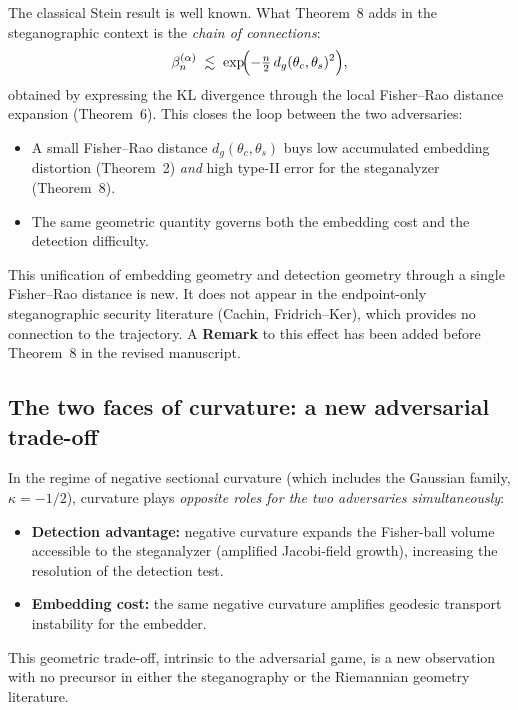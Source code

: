 \documentclass[12pt,a4paper]{article}
\newcommand{\dg}{d_g}
\begin{document}
\begin{responsebox}
The classical Stein result is well known.
What Theorem~8 adds in the steganographic context is the \emph{chain of
connections}:
\[
  \beta_n^{(\alpha)}
  \;\lesssim\;
  \exp\!\Bigl(-\tfrac{n}{2}\,\dg(\theta_c,\theta_s)^2\Bigr),
\]
obtained by expressing the KL divergence through the local Fisher--Rao
distance expansion (Theorem~6).
This closes the loop between the two adversaries:
\begin{itemize}[nosep]
  \item A small Fisher--Rao distance $\dg(\theta_c,\theta_s)$ buys
        low accumulated embedding distortion (Theorem~2) \emph{and}
        high type-II error for the steganalyzer (Theorem~8).
  \item The same geometric quantity governs both the embedding
        cost and the detection difficulty.
\end{itemize}
This unification of embedding geometry and detection geometry through a single
Fisher--Rao distance is new.
It does not appear in the endpoint-only steganographic security literature
(Cachin, Fridrich--Ker), which provides no connection to the trajectory.
A \textbf{Remark} to this effect has been added before Theorem~8 in the
revised manuscript.
\end{responsebox}

\subsection{The two faces of curvature: a new adversarial trade-off}

\begin{responsebox}
In the regime of negative sectional curvature (which includes the Gaussian
family, $\kappa=-1/2$), curvature plays \emph{opposite roles for the two
adversaries simultaneously}:
\begin{itemize}[nosep]
  \item \textbf{Detection advantage:} negative curvature expands the
        Fisher-ball volume accessible to the steganalyzer (amplified
        Jacobi-field growth), increasing the resolution of the detection test.
  \item \textbf{Embedding cost:} the same negative curvature amplifies
        geodesic transport instability for the embedder.
\end{itemize}
This geometric trade-off, intrinsic to the adversarial game, is a new
observation with no precursor in either the steganography or the Riemannian
geometry literature.
\end{responsebox}
\end{document}
